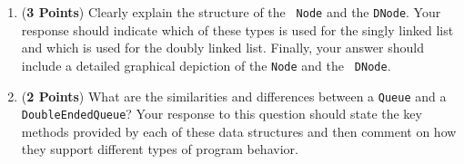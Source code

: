 \documentclass[12pt]{article}
\begin{document}
\begin{enumerate}
\begin{enumerate}

  \item ({\bf 3 Points}) Clearly explain the structure of the {\tt
    Node} and the {\tt DNode}.  Your response should indicate which of
    these types is used for the singly linked list and which is used
    for the doubly linked list.  Finally, your answer should include a
    detailed graphical depiction of the {\tt Node} and the {\tt
      DNode}.

  \item ({\bf 2 Points}) What are the similarities and differences
    between a {\tt Queue} and a {\tt DoubleEndedQueue}?  Your response
    to this question should state the key methods provided by each of
    these data structures and then comment on how they support
    different types of program behavior.






\end{enumerate}
\end{enumerate}
\end{document}
